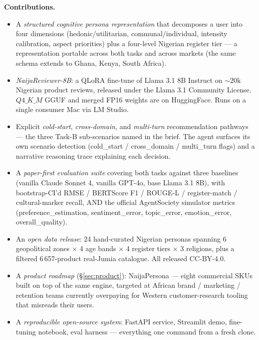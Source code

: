 \documentclass[sigconf,nonacm,balance]{acmart}
\begin{document}
\textbf{Contributions.}
\begin{itemize}[leftmargin=*]
    \item A \emph{structured cognitive persona representation} that decomposes
          a user into four dimensions (hedonic/utilitarian, communal/individual,
          intensity calibration, aspect priorities) plus a four-level Nigerian
          register tier --- a representation portable across both tasks and
          across markets (the same schema extends to Ghana, Kenya, South Africa).
    \item \emph{NaijaReviewer-8B}: a QLoRA fine-tune of Llama 3.1 8B Instruct
          on \(\sim\!20\)k Nigerian product reviews, released under the Llama
          3.1 Community License. \(Q4\_K\_M\) GGUF and merged FP16 weights are
          on HuggingFace. Runs on a single consumer Mac via LM Studio.
    \item Explicit \emph{cold-start}, \emph{cross-domain}, and \emph{multi-turn}
          recommendation pathways --- the three Task-B sub-scenarios named in
          the brief. The agent surfaces its own scenario detection
          (\textsf{cold\_start} / \textsf{cross\_domain} / \textsf{multi\_turn}
          flags) and a narrative reasoning trace explaining each decision.
    \item A \emph{paper-first evaluation suite} covering both tasks against
          three baselines (vanilla Claude Sonnet 4, vanilla GPT-4o, base Llama
          3.1 8B), with bootstrap-CI'd RMSE / BERTScore F1 / ROUGE-L /
          register-match / cultural-marker recall, AND the official
          AgentSociety simulator metrics (\textsf{preference\_estimation},
          \textsf{sentiment\_error}, \textsf{topic\_error},
          \textsf{emotion\_error}, \textsf{overall\_quality}).
    \item An \emph{open data release}: 24 hand-curated Nigerian personas
          spanning 6 geopolitical zones $\times$ 4 age bands $\times$ 4 register
          tiers $\times$ 3 religions, plus a filtered 6\,657-product real-Jumia
          catalogue. All released CC-BY-4.0.
    \item A \emph{product roadmap} (§\ref{sec:product}): NaijaPersona ---
          eight commercial SKUs built on top of the same engine, targeted at
          African brand / marketing / retention teams currently overpaying for
          Western customer-research tooling that misreads their users.
    \item A \emph{reproducible open-source system}: FastAPI service, Streamlit
          demo, fine-tuning notebook, eval harness --- everything one command
          from a fresh clone.
\end{itemize}
\end{document}
